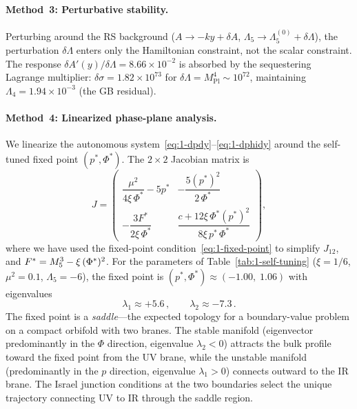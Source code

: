 \paragraph{Method~3: Perturbative stability.} Perturbing around the RS background ($A \to -ky + \delta A$, $\Lambda_5 \to \Lambda_5^{(0)} + \delta\Lambda$), the perturbation $\delta\Lambda$ enters only the Hamiltonian constraint, not the scalar constraint. The response $\delta A'(y)/\delta\Lambda = 8.66 \times 10^{-2}$ is absorbed by the sequestering Lagrange multiplier: $\delta\sigma = 1.82 \times 10^{73}$ for $\delta\Lambda = M_{\mathrm{Pl}}^4 \sim 10^{72}$, maintaining $\Lambda_4 = 1.94 \times 10^{-3}$ (the GB residual).

\paragraph{Method~4: Linearized phase-plane analysis.} We linearize the autonomous system~\eqref{eq:1-dpdy}--\eqref{eq:1-dphidy} around the self-tuned fixed point $(p^*, \Phi^*)$. The $2 \times 2$ Jacobian matrix is
\begin{equation}
\label{eq:1-jacobian}
J = \begin{pmatrix}
\dfrac{\mu^2}{4\xi\,\Phi^*} - 5p^* & -\dfrac{5(p^*)^2}{2\,\Phi^*} \\[10pt]
-\dfrac{3F^*}{2\xi\,\Phi^*} & \dfrac{c + 12\xi\,\Phi^*(p^*)^2}{8\xi\, p^*\, \Phi^*}
\end{pmatrix},
\end{equation}
where we have used the fixed-point condition~\eqref{eq:1-fixed-point} to simplify $J_{12}$, and $F^* = M_5^3 - \xi\,(\Phi^*)^2$. For the parameters of Table~\ref{tab:1-self-tuning} ($\xi = 1/6$, $\mu^2 = 0.1$, $\Lambda_5 = -6$), the fixed point is $(p^*, \Phi^*) \approx (-1.00,\; 1.06)$ with eigenvalues
\begin{equation}
\label{eq:1-eigenvalues}
\lambda_1 \approx +5.6\,, \qquad \lambda_2 \approx -7.3\,.
\end{equation}
The fixed point is a \emph{saddle}---the expected topology for a boundary-value problem on a compact orbifold with two branes. The stable manifold (eigenvector predominantly in the $\Phi$ direction, eigenvalue $\lambda_2 < 0$) attracts the bulk profile toward the fixed point from the UV brane, while the unstable manifold (predominantly in the $p$ direction, eigenvalue $\lambda_1 > 0$) connects outward to the IR brane. The Israel junction conditions at the two boundaries select the unique trajectory connecting UV to IR through the saddle region.


